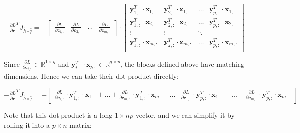 \documentclass{article}
\begin{document}
\begin{center}
    $ -\frac{\partial L}{\partial \mathbf{c}}^{T} J_{\widehat{h}\circ\widehat{g}} = 
    -\begin{bmatrix}
        \frac{\partial L}{\partial \mathbf{c}_{1,:}} & \frac{\partial L}{\partial \mathbf{c}_{2,:}} & \hdots & \frac{\partial L}{\partial \mathbf{c}_{m,:}}
    \end{bmatrix} \cdot
    \begin{bmatrix}
    \mathbf{y}_{1,:}^T\cdot\mathbf{x}_{1,:}  &  \mathbf{y}_{2,:}^T\cdot\mathbf{x}_{1,:} & \hdots & \mathbf{y}_{p,:}^T\cdot\mathbf{x}_{1,:} \\
    \mathbf{y}_{1,:}^T\cdot\mathbf{x}_{2,:}  &  \mathbf{y}_{2,:}^T\cdot\mathbf{x}_{2,:} & \hdots & \mathbf{y}_{p,:}^T\cdot\mathbf{x}_{2,:} \\
    \vdots & \vdots & \ddots & \vdots \\
    \mathbf{y}_{1,:}^T\cdot\mathbf{x}_{m,:}  &  \mathbf{y}_{2,:}^T\cdot\mathbf{x}_{m,:} & \hdots & \mathbf{y}_{p,:}^T\cdot\mathbf{x}_{m,:} \\
     \end{bmatrix}
    $
\end{center}
Since $\frac{\partial L}{\partial \mathbf{c}_{i,:}} \in \mathbb{R}^{1\times q}$ and $\mathbf{y}^T_{i,:}\cdot \mathbf{x}_{j,:} \in \mathbb{R}^{q\times n}$, the blocks defined above have matching dimensions. Hence we can take their dot product directly:
\begin{center}
    $ -\frac{\partial L}{\partial \mathbf{c}}^{T} J_{\widehat{h}\circ\widehat{g}} = -
    \begin{bmatrix}
        \frac{\partial L}{\partial \mathbf{c}_{1,:}} \cdot \mathbf{y}^T_{1,:}\cdot \mathbf{x}_{1,:}  + \hdots + \frac{\partial L}{\partial \mathbf{c}_{m,:}} \cdot \mathbf{y}^T_{1,:}\cdot \mathbf{x}_{m,:}  &
        \hdots & 
        \frac{\partial L}{\partial \mathbf{c}_{1,:}} \cdot \mathbf{y}^T_{p,:}\cdot \mathbf{x}_{1,:}   + \hdots + \frac{\partial L}{\partial \mathbf{c}_{m,:}} \cdot \mathbf{y}^T_{p,:}\cdot \mathbf{x}_{m,:} 
    \end{bmatrix}
    $
\end{center}
Note that this dot product is a long $1\times np$ vector, and we can simplify it by rolling it into a $p\times n$ matrix:
\end{document}
